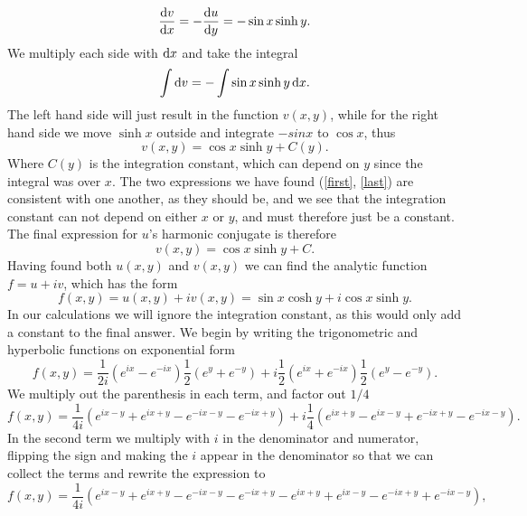\documentclass[12pt,twoside]{article}
\begin{document}
\begin{equation}
  \dv{v}{x} = -\dv{u}{y} = - \sin{x}\sinh{y}.
\end{equation}
We multiply each side with $\dif x$ and take the integral
\begin{equation}
  \int \dif v = - \int \sin{x}\sinh{y} \dif x.
\end{equation}
The left hand side will just result in the function $v(x, y)$, while for the right hand side we move $\sinh{x}$ outside and integrate $-sin{x}$ to $\cos{x}$, thus
\begin{equation}
  v(x, y) = \cos{x}\sinh{y} + C(y). \label{last}
\end{equation}
Where $C(y)$ is the integration constant, which can depend on $y$ since the integral was over $x$. The two expressions we have found (\ref{first}, \ref{last}) are consistent with one another, as they should be, and we see that the integration constant can not depend on either $x$ or $y$, and must therefore just be a constant. The final expression for $u$'s harmonic conjugate is therefore
\begin{equation}
  v(x, y) = \cos{x}\sinh{y} + C. \label{v}
\end{equation}
Having found both $u(x,y)$ and $v(x,y)$ we can find the analytic function $f=u+iv$, which has the form
\begin{equation}
  f(x, y) = u(x, y) + iv(x, y) = \sin{x}\cosh{y} + i\cos{x}\sinh{y}.
\end{equation}
In our calculations we will ignore the integration constant, as this would only add a constant to the final answer. We begin by writing the trigonometric and hyperbolic functions on exponential form
\begin{equation}
  f(x, y) = \frac{1}{2i}\left(e^{ix}-e^{-ix}\right)\frac{1}{2}\left(e^{y}+e^{-y}\right) + i\frac{1}{2}\left(e^{ix}+e^{-ix}\right)\frac{1}{2}\left(e^{y}-e^{-y}\right).
\end{equation}
We multiply out the parenthesis in each term, and factor out $1/4$
\begin{equation}
  f(x, y) = \frac{1}{4i}\left(e^{ix-y}+e^{ix+y}-e^{-ix-y}-e^{-ix+y}\right) + i\frac{1}{4}\left(e^{ix+y}-e^{ix-y}+e^{-ix+y}-e^{-ix-y}\right).
\end{equation}
In the second term we multiply with $i$ in the denominator and numerator, flipping the sign and making the $i$ appear in the denominator so that we can collect the terms and rewrite the expression to
\begin{equation}
  f(x, y) = \frac{1}{4i}\left(e^{ix-y}+e^{ix+y}-e^{-ix-y}-e^{-ix+y} - e^{ix+y}+ e^{ix-y}-e^{-ix+y}+e^{-ix-y}\right),
\end{equation}
\end{document}
